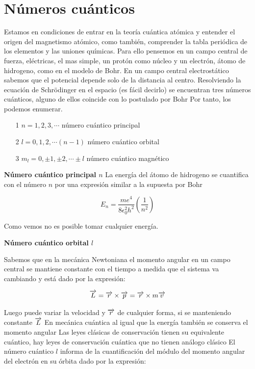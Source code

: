 \section{Números cuánticos}

Estamos en condiciones de entrar en la teoría cuántica atómica y entender el origen del magnetismo atómico, como también, comprender la tabla periódica de los elementos y las uniones químicas. Para ello pensemos en un campo central de fuerza, eléctricas, el mas simple, un protón como núcleo y un electrón, átomo de hidrogeno, como en el modelo de Bohr. En un campo central electrostático sabemos que el potencial depende solo de la distancia al centro. Resolviendo la ecuación de Schrödinger en el espacio (es fácil decirlo) se encuentran tres números cuánticos, alguno de ellos coincide con lo postulado por Bohr Por tanto, los podemos enumerar.

\begin{itemize}
	\item[1]$n=1, 2, 3, \cdots$ número cuántico principal
	\item[2]$l=0, 1, 2, \cdots (n-1)$ número cuántico orbital
	\item[3]$m_{l}=0, \pm 1,\pm 2, \cdots \pm l$ número cuántico magnético
\end{itemize}

\textbf{Número cuántico principal $n$}
La energía del átomo de hidrogeno se cuantifica con el número $n$ por una expresión similar a la supuesta por Bohr

\begin{equation}
	E_{n}= \dfrac{me^{4}}{8\epsilon_{0}^{2}h^{2}} \left(\dfrac{1}{n^{2}} \right) 
\end{equation}

Como vemos no es posible tomar cualquier energía.

\textbf{Número cuántico orbital $l$}

Sabemos que en la mecánica Newtoniana el momento angular en un campo central se mantiene constante con el tiempo a medida que el sistema va cambiando y está dado por la expresión:

\begin{equation}
	\overrightarrow{L}= \overrightarrow{r} \times \overrightarrow{p} = \overrightarrow{r} \times m \overrightarrow{v} 
\end{equation}

Luego puede variar la velocidad y $\overrightarrow{r}$ de cualquier forma, si se manteniendo constante $\overrightarrow{L}$ En mecánica cuántica al igual que la energía también se conserva el momento angular Las leyes clásicas de conservación tienen su equivalente cuántico, hay leyes de conservación cuántica que no tienen
análogo clásico El número cuántico $l$ informa de la cuantificación del módulo del momento angular del electrón en su órbita dado por la expresión:

